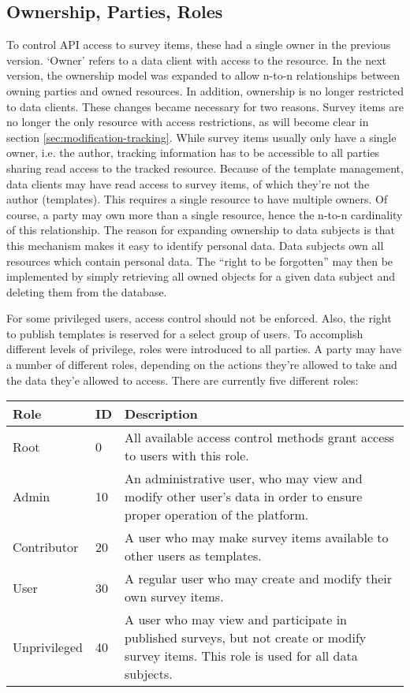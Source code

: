 \subsection{Ownership, Parties, Roles}
    To control API access to survey items, these had a single
    owner in the previous version. `Owner' refers to a data client with access
    to the resource. In the next version, the ownership model
    was expanded to allow n-to-n relationships between owning parties
    and owned resources. In addition, ownership is no longer restricted to
    data clients. These changes became necessary for two reasons.
    Survey items are no longer the only resource with access restrictions,
    as will become clear in section \ref{sec:modification-tracking}.
    While survey items usually only have a single owner, i.e. the author, 
    tracking information has to be accessible to all parties sharing
    read access to the tracked resource. Because of the template management,
    data clients may have read access to survey items, of which they're not
    the author (templates). This requires a single resource to have multiple owners.
    Of course, a party may own more than a single resource, hence the n-to-n
    cardinality of this relationship. The reason for expanding ownership
    to data subjects is that this mechanism makes it easy to identify personal
    data. Data subjects own all resources which contain
    personal data. The ``right to be forgotten'' may then be implemented by
    simply retrieving all owned objects for a given data subject and deleting 
    them from the database.

    For some privileged users, access control should not be enforced.
    Also, the right to publish templates is reserved for a select
    group of users. To accomplish different levels of privilege,
    roles were introduced to all parties. A party may have a number
    of different roles, depending on the actions they're allowed to take and
    the data they'e allowed to access. There are currently five different roles:

    \begin{table}[H]
        \begin{tabularx}{\textwidth}{|l|l|X|}
            \hline
            Role & ID & Description \\
            \hline \hline
            Root & 0 & All available access control methods grant access to users with this role. \\
            Admin & 10 & An administrative user, who may view and modify other user's data in order to ensure proper operation of the platform. \\
            Contributor & 20 & A user who may make survey items available to other users as templates. \\
            User & 30 & A regular user who may create and modify their own survey items. \\
            Unprivileged & 40 & A user who may view and participate in published surveys, but not create or modify survey items. This role is used for all data subjects.\\
            \hline
        \end{tabularx}
    \end{table}

